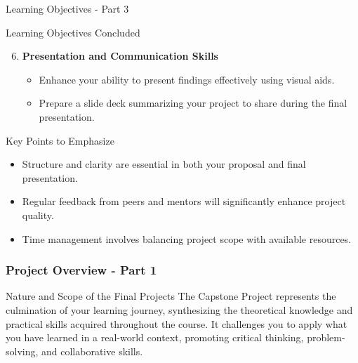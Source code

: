 \documentclass[aspectratio=169]{beamer}
\begin{document}
\begin{frame}[fragile]{Learning Objectives - Part 3}
    \begin{block}{Learning Objectives Concluded}
        \begin{enumerate}
            \setcounter{enumi}{5} %
            
            \item \textbf{Presentation and Communication Skills}
            \begin{itemize}
                \item Enhance your ability to present findings effectively using visual aids.
                \item Prepare a slide deck summarizing your project to share during the final presentation.
            \end{itemize}
        \end{enumerate}
    \end{block}
    
    \begin{block}{Key Points to Emphasize}
        \begin{itemize}
            \item Structure and clarity are essential in both your proposal and final presentation.
            \item Regular feedback from peers and mentors will significantly enhance project quality.
            \item Time management involves balancing project scope with available resources.
        \end{itemize}
    \end{block}
\end{frame}

\begin{frame}[fragile]
  \frametitle{Project Overview - Part 1}
  \begin{block}{Nature and Scope of the Final Projects}
    The Capstone Project represents the culmination of your learning journey, synthesizing the theoretical knowledge and practical skills acquired throughout the course.
    It challenges you to apply what you have learned in a real-world context, promoting critical thinking, problem-solving, and collaborative skills.
  \end{block}
\end{frame}
\end{document}
